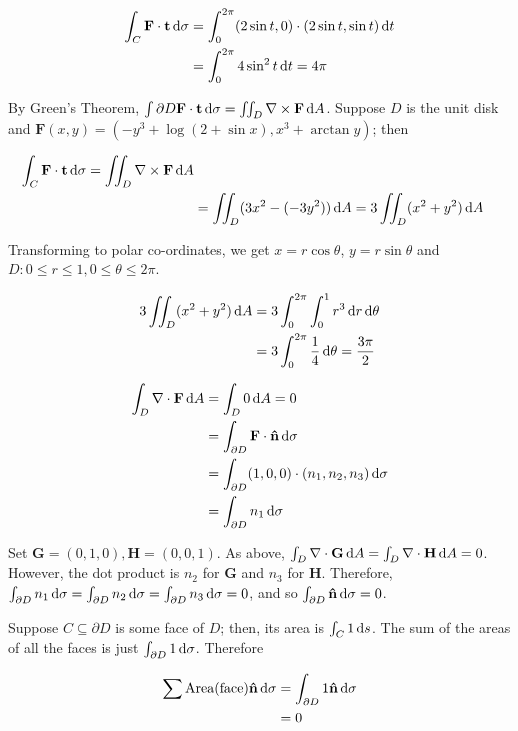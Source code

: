 \begin{align*}
  \int_C \mathbf{F} \cdot \mathbf{t} \mathop{}\!\mathrm{d} \sigma &= \int_0^{2\pi} (2\sin t, 0) \cdot (2\sin t, \sin t) \mathop{}\!\mathrm{d} t \\
  &= \int_0^{2\pi} 4\sin^2 t \mathop{}\!\mathrm{d} t = 4\pi
\end{align*}

By Green's Theorem, $\int{\partial D} \mathbf{F} \cdot \mathbf{t} \mathop{}\!\mathrm{d} \sigma = \iint_D \nabla \times \mathbf{F} \mathop{}\!\mathrm{d} A$. Suppose $D$ is the unit disk and $\mathbf{F}(x, y) = (-y^3 + \log(2 + \sin x), x^3 + \arctan y)$; then

\begin{align*}
  \int_C \mathbf{F} \cdot \mathbf{t} \mathop{}\!\mathrm{d} \sigma = \iint_D \nabla \times \mathbf{F} \mathop{}\!\mathrm{d} A \\
  &= \iint_D (3x^2 - (-3y^2)) \mathop{}\!\mathrm{d} A = 3\iint_D (x^2 + y^2) \mathop{}\!\mathrm{d} A
\end{align*}

Transforming to polar co-ordinates, we get $x = r\cos\theta$, $y = r\sin\theta$ and $D: 0 \leq r \leq 1, 0 \leq \theta \leq 2\pi$.

\begin{align*}
  3\iint_D (x^2 + y^2) \mathop{}\!\mathrm{d} A &= 3 \int_0^{2\pi} \int_0^1 r^3 \mathop{}\!\mathrm{d} r \mathop{}\!\mathrm{d} \theta \\
  &= 3 \int_0^{2\pi} \frac{1}{4} \mathop{}\!\mathrm{d} \theta = \frac{3\pi}{2}
\end{align*}


\begin{align*}
  \int_D \nabla \cdot \mathbf{F} \mathop{}\!\mathrm{d} A &= \int_D 0 \mathop{}\!\mathrm{d} A = 0 \\
  &= \int_{\partial D} \mathbf{F} \cdot \mathbf{\hat{n}} \mathop{}\!\mathrm{d} \sigma \\
  &= \int_{\partial D} (1, 0, 0) \cdot (n_1, n_2, n_3) \mathop{}\!\mathrm{d} \sigma \\
  &= \int_{\partial D} n_1 \mathop{}\!\mathrm{d} \sigma
\end{align*}

Set $\mathbf{G} = (0, 1, 0), \mathbf{H} = (0, 0, 1)$. As above, $\int_D \nabla \cdot \mathbf{G} \mathop{}\!\mathrm{d} A = \int_D \nabla \cdot \mathbf{H} \mathop{}\!\mathrm{d} A = 0$. However, the dot product is $n_2$ for $\mathbf{G}$ and $n_3$ for $\mathbf{H}$. Therefore, $\int_{\partial D} n_1 \mathop{}\!\mathrm{d} \sigma = \int_{\partial D} n_2 \mathop{}\!\mathrm{d} \sigma = \int_{\partial D} n_3 \mathop{}\!\mathrm{d} \sigma = 0$, and so $\int_{\partial D} \mathbf{\hat{n}} \mathop{}\!\mathrm{d} \sigma = 0$.

Suppose $C \subseteq \partial D$ is some face of $D$; then, its area is $\int_C 1 \mathop{}\!\mathrm{d} s$. The sum of the areas of all the faces is just $\int_{\partial D} 1 \mathop{}\!\mathrm{d} \sigma$. Therefore

\begin{align*}
  \sum \mathrm{Area(face)} \mathbf{\hat{n}} \mathop{}\!\mathrm{d} \sigma &= \int_{\partial D} 1 \mathbf{\hat{n}} \mathop{}\!\mathrm{d} \sigma \\
  &= 0
\end{align*}


